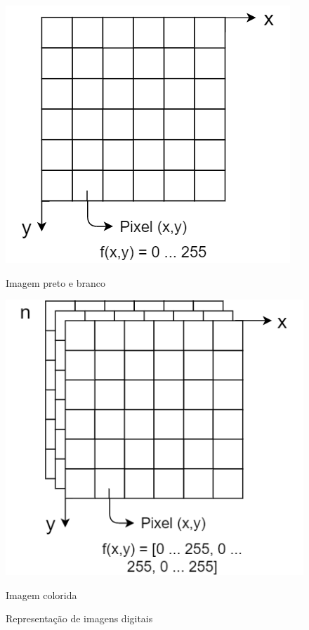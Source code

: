 \documentclass[12pt]{report}
\begin{document}
\begin{figure}
  \centering
  \begin{minipage}[b]{0.4\textwidth}
    \includegraphics[width=\textwidth]{images/imagembew.png}
    \caption{Imagem preto e branco}
  \end{minipage}
  \hfill
  \begin{minipage}[b]{0.4\textwidth}
    \includegraphics[width=\textwidth]{images/imagemcolorida.png}
    \caption{Imagem colorida}
  \end{minipage}
  \caption{Representação de imagens digitais}
  \source{}
  \label{fig:repre-imgs}
\end{figure}
\end{document}

